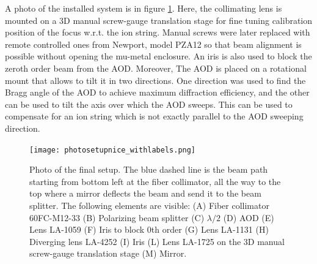 A photo of the installed system is in figure \ref{photosetup}. Here, the collimating lens is mounted on a 3D manual screw-gauge translation stage for fine tuning calibration position of the focus w.r.t. the ion string. Manual screws were later replaced with remote controlled ones from Newport, model PZA12 so that beam alignment is possible without opening the mu-metal enclosure. An iris is also used to block the zeroth order beam from the AOD. Moreover, The AOD is placed on a rotational mount that allows to tilt it in two directions. One direction was used to find the Bragg angle of the AOD to achieve maximum diffraction efficiency, and the other can be used to tilt the axis over which the AOD sweeps. This can be used to compensate for an ion string which is not exactly parallel to the AOD sweeping direction.

\begin{figure}[H]
\centering
\texttt{[image: photosetupnice\_withlabels.png]}
\caption{Photo of the final setup. The blue dashed line is the beam path starting from bottom left at the fiber collimator, all the way to the top where a mirror deflects the beam and send it to the beam splitter. The following elements are visible: (A) Fiber collimator 60FC-M12-33 (B) Polarizing beam splitter (C) $\lambda/2$ (D) AOD (E) Lens LA-1059 (F) Iris to block 0th order (G) Lens LA-1131 (H) Diverging lens LA-4252 (I) Iris (L) Lens LA-1725 on the 3D manual screw-gauge translation stage (M) Mirror. }
\label{photosetup}
\end{figure}
